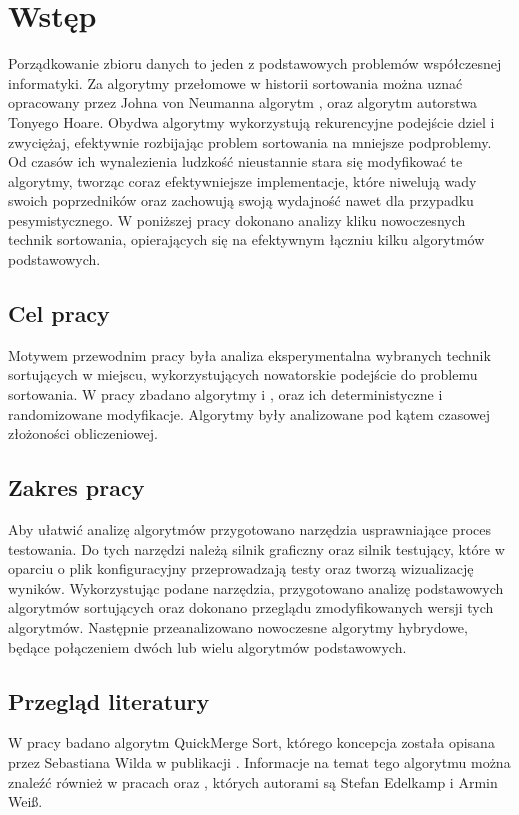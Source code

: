\chapter*{Wstęp}
\thispagestyle{chapterBeginStyle}

Porządkowanie zbioru danych to jeden z podstawowych problemów współczesnej informatyki. Za algorytmy przełomowe w historii sortowania można uznać opracowany przez Johna von Neumanna algorytm , oraz algorytm   autorstwa Tonyego Hoare.
Obydwa algorytmy wykorzystują rekurencyjne podejście dziel i zwyciężaj, efektywnie rozbijając problem sortowania na mniejsze podproblemy. Od czasów ich wynalezienia ludzkość nieustannie stara się modyfikować te algorytmy, tworząc coraz efektywniejsze implementacje, które niwelują wady swoich poprzedników oraz zachowują swoją wydajność nawet dla przypadku pesymistycznego. W poniższej pracy dokonano analizy kliku nowoczesnych technik sortowania, opierających się na efektywnym łączniu kilku algorytmów podstawowych.\\

\section*{Cel pracy}
Motywem przewodnim pracy była analiza eksperymentalna wybranych technik sortujących w miejscu, wykorzystujących nowatorskie podejście do problemu sortowania. W pracy zbadano algorytmy  i , oraz ich deterministyczne i randomizowane modyfikacje. Algorytmy były analizowane pod kątem czasowej złożoności obliczeniowej.\\

\section*{Zakres pracy}
Aby ułatwić analizę algorytmów przygotowano narzędzia usprawniające proces testowania. Do tych narzędzi należą silnik graficzny oraz silnik testujący, które w oparciu o plik konfiguracyjny przeprowadzają testy oraz tworzą wizualizację wyników.
Wykorzystując podane narzędzia, przygotowano analizę podstawowych algorytmów sortujących oraz dokonano przeglądu zmodyfikowanych wersji tych algorytmów. Następnie przeanalizowano nowoczesne algorytmy hybrydowe, będące połączeniem dwóch lub wielu algorytmów podstawowych.\\

\section*{Przegląd literatury}
W pracy badano algorytm QuickMerge Sort, którego koncepcja została opisana przez Sebastiana Wilda w publikacji  \cite{QuickXsort}. Informacje na temat tego algorytmu można znaleźć również w pracach  \cite{QuickMergesort1} oraz  \cite{QuickMergesort2}, których autorami są Stefan Edelkamp i Armin Weiß.\\

